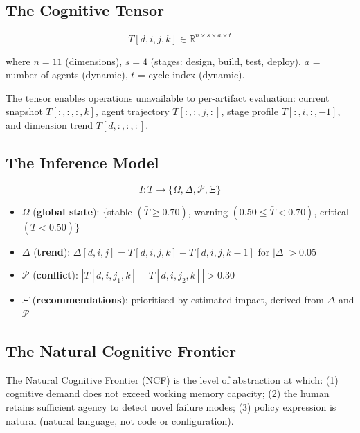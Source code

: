 \documentclass[manuscript,review,anonymous]{acmart}
\begin{document}
\subsection{The Cognitive Tensor}

\begin{equation}
  T[d, i, j, k] \in \mathbb{R}^{n \times s \times a \times t}
\end{equation}

where $n = 11$ (dimensions), $s = 4$ (stages: design, build, test, deploy),
$a$ = number of agents (dynamic), $t$ = cycle index (dynamic).

The tensor enables operations unavailable to per-artifact evaluation: current
snapshot $T[:,:,:,k]$, agent trajectory $T[:,:,j,:]$, stage profile $T[:,i,:,-1]$,
and dimension trend $T[d,:,:,:]$.

\subsection{The Inference Model}

\begin{equation}
  I: T \rightarrow \{\Omega, \Delta, \mathcal{P}, \Xi\}
\end{equation}

\begin{itemize}
  \item $\Omega$ (\textbf{global state}): $\{$stable $(\bar{T} \geq 0.70)$, warning
    $(0.50 \leq \bar{T} < 0.70)$, critical $(\bar{T} < 0.50)\}$
  \item $\Delta$ (\textbf{trend}): $\Delta[d,i,j] = T[d,i,j,k] - T[d,i,j,k-1]$
    for $|\Delta| > 0.05$
  \item $\mathcal{P}$ (\textbf{conflict}): $|T[d,i,j_1,k] - T[d,i,j_2,k]| > 0.30$
  \item $\Xi$ (\textbf{recommendations}): prioritised by estimated impact, derived
    from $\Delta$ and $\mathcal{P}$
\end{itemize}

\subsection{The Natural Cognitive Frontier}

The Natural Cognitive Frontier (NCF) is the level of abstraction at which:
(1) cognitive demand does not exceed working memory capacity;
(2) the human retains sufficient agency to detect novel failure modes;
(3) policy expression is natural (natural language, not code or configuration).
\end{document}
